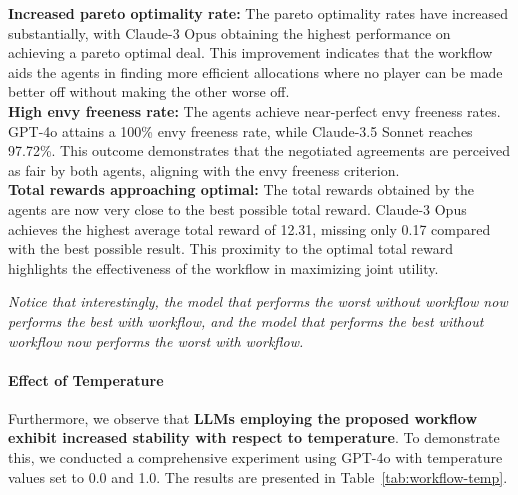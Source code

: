 \textbf{Increased pareto optimality rate:} The pareto optimality rates have increased substantially, with Claude-3 Opus obtaining the highest performance on achieving a pareto optimal deal. This improvement indicates that the workflow aids the agents in finding more efficient allocations where no player can be made better off without making the other worse off.\\
\textbf{High envy freeness rate:} The agents achieve near-perfect envy freeness rates. GPT-4o attains a 100\% envy freeness rate, while Claude-3.5 Sonnet reaches 97.72\%. This outcome demonstrates that the negotiated agreements are perceived as fair by both agents, aligning with the envy freeness criterion.\\
\textbf{Total rewards approaching optimal:} The total rewards obtained by the agents are now very close to the best possible total reward. Claude-3 Opus achieves the highest average total reward of 12.31, missing only 0.17 compared with the best possible result. This proximity to the optimal total reward highlights the effectiveness of the workflow in maximizing joint utility.

\textit{Notice that interestingly, the model that performs the worst without workflow now performs the best with workflow, and the model that performs the best without workflow now performs the worst with workflow.}


\paragraph{Effect of Temperature}
Furthermore, we observe that \textbf{LLMs employing the proposed workflow exhibit increased stability with respect to temperature}.  To demonstrate this, we conducted a comprehensive experiment using GPT-4o with temperature values set to 0.0 and 1.0. The results are presented in Table~\ref{tab:workflow-temp}.

\begin{table}[!ht]
    \centering
    \caption{Workflow-GPT-4o with temperature 0.0 and 1.0}
    \label{tab:workflow-temp}
\end{table}

